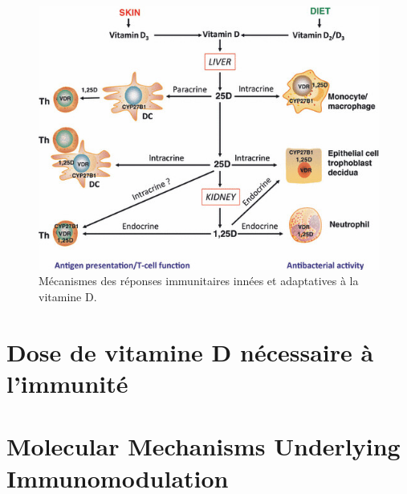 \documentclass[
  a4paper,
  DIV=11,
  numbers=noendperiod,
  listof=totoc]{scrreprt}
\begin{document}
\begin{figure}

{\centering \includegraphics{figures/meca-intracrine.jpg}

}

\caption{Mécanismes des réponses immunitaires innées et adaptatives à la
vitamine D.}

\end{figure}

\hypertarget{dose-de-vitamine-d-nuxe9cessaire-uxe0-limmunituxe9}{%
\section{Dose de vitamine D nécessaire à
l'immunité}\label{dose-de-vitamine-d-nuxe9cessaire-uxe0-limmunituxe9}}

\textcite{Hewison.2007}

\hypertarget{molecular-mechanisms-underlying-immunomodulation}{%
\section{Molecular Mechanisms Underlying
Immunomodulation}\label{molecular-mechanisms-underlying-immunomodulation}}

\textcite{Dankers.2017}
\end{document}
